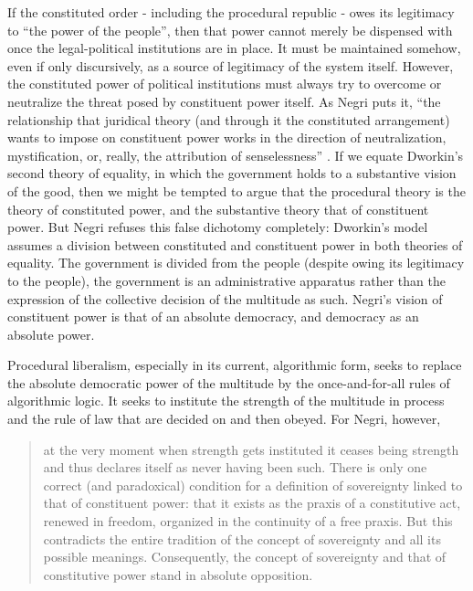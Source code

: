 \documentclass[12pt,oneside]{memoir}
\begin{document}
If the constituted order - including the procedural republic - owes its legitimacy to ``the power of the people'', then that power cannot merely be dispensed with once the legal-political institutions are in place. It must be maintained somehow, even if only discursively, as a source of legitimacy of the system itself. However, the constituted power of political institutions must always try to overcome or neutralize the threat posed by constituent power itself. As Negri puts it, ``the relationship that juridical theory (and through it the constituted arrangement) wants to impose on constituent power works in the direction of neutralization, mystification, or, really, the attribution of senselessness'' \cite[10]{Negri1999}. If we equate Dworkin's second theory of equality, in which the government holds to a substantive vision of the good, then we might be tempted to argue that the procedural theory is the theory of constituted power, and the substantive theory that of constituent power. But Negri refuses this false dichotomy completely: Dworkin's model assumes a division between constituted and constituent power in both theories of equality. The government is divided from the people (despite owing its legitimacy to the people), the government is an administrative apparatus rather than the expression of the collective decision of the multitude as such. Negri's vision of constituent power is that of an absolute democracy, and democracy as an absolute power.
	
Procedural liberalism, especially in its current, algorithmic form, seeks to replace the absolute democratic power of the multitude by the once-and-for-all rules of algorithmic logic. It seeks to institute the strength of the multitude in process and the rule of law that are decided on and then obeyed. For Negri, however, 
	
	\begin{quote}
	at the very moment when strength gets instituted it ceases being strength and thus declares itself as never having been such. There is only one correct (and paradoxical) condition for a definition of sovereignty linked to that of constituent power: that it exists as the praxis of a constitutive act, renewed in freedom, organized in the continuity of a free praxis. But this contradicts the entire tradition of the concept of sovereignty and all its possible meanings. Consequently, the concept of sovereignty and that of constitutive power stand in absolute opposition. \cite[22]{Negri1999}
	\end{quote}
\end{document}
